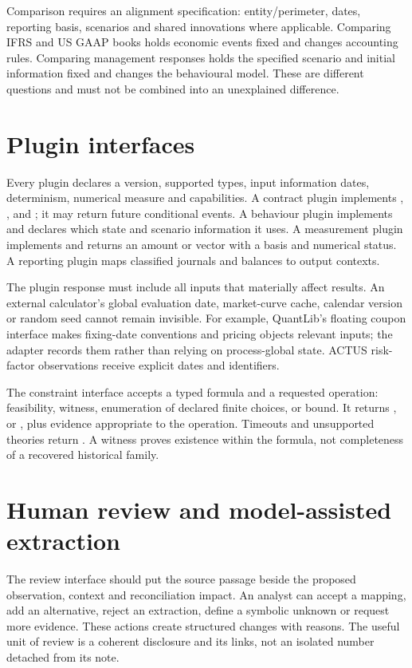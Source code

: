 Comparison requires an alignment specification: entity/perimeter, dates,
reporting basis, scenarios and shared innovations where applicable. Comparing
IFRS and US GAAP books holds economic events fixed and changes accounting
rules. Comparing management responses holds the specified scenario and
initial information fixed and changes the behavioural model. These are
different questions and must not be combined into an unexplained difference.

\section{Plugin interfaces}

Every plugin declares a version, supported types, input information dates,
determinism, numerical measure and capabilities. A contract plugin implements
, ,  and ; it may
return future conditional events. A behaviour plugin implements
 and declares which state and scenario information it uses.
A measurement plugin implements  and returns an amount or
vector with a basis and numerical status. A reporting plugin maps classified
journals and balances to output contexts.

The plugin response must include all inputs that materially affect results.
An external calculator's global evaluation date, market-curve cache, calendar
version or random seed cannot remain invisible. For example, QuantLib's
floating coupon interface makes fixing-date conventions and pricing objects
relevant inputs; the adapter records them rather than relying on process-global
state. ACTUS risk-factor observations receive explicit dates and identifiers.

The constraint interface accepts a typed formula and a requested operation:
feasibility, witness, enumeration of declared finite choices, or bound. It
returns ,  or , plus evidence appropriate
to the operation. Timeouts and unsupported theories return .
A witness proves existence within the formula, not completeness of a recovered
historical family.

\section{Human review and model-assisted extraction}

The review interface should put the source passage beside the proposed
observation, context and reconciliation impact. An analyst can accept a
mapping, add an alternative, reject an extraction, define a symbolic unknown
or request more evidence. These actions create structured changes with
reasons. The useful unit of review is a coherent disclosure and its links,
not an isolated number detached from its note.

